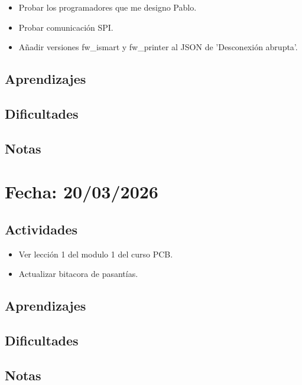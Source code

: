 \documentclass[12pt, a4paper]{article}
\begin{document}
    \begin{itemize}
        \item Probar los programadores que me designo Pablo.
        \item Probar comunicación SPI.
        \item Añadir versiones fw\_ismart y fw\_printer al JSON de 'Desconexión abrupta'.
    \end{itemize}

    \subsection*{Aprendizajes}

    \subsection*{Dificultades}

    \subsection*{Notas}

    \section*{Fecha: 20/03/2026}

    \subsection*{Actividades}

    \begin{itemize}
        \item Ver lección 1 del modulo 1 del curso PCB.
        \item Actualizar bitacora de pasantías. 
    \end{itemize}

    \subsection*{Aprendizajes}

    \subsection*{Dificultades}

    \subsection*{Notas}
\end{document}
